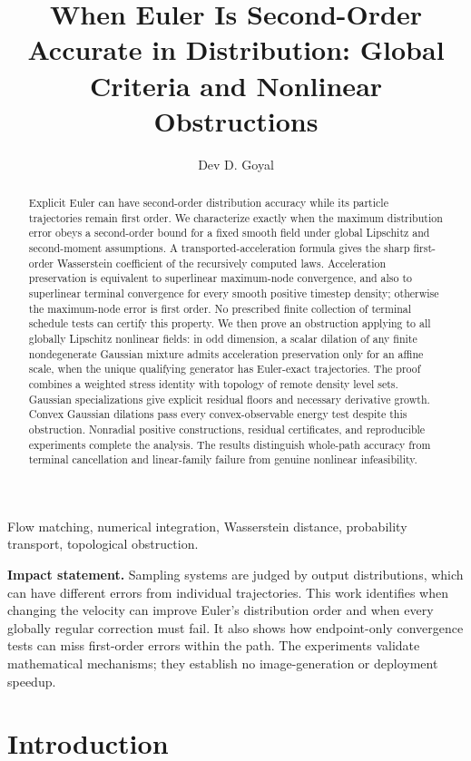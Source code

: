 \documentclass[journal,10pt,romanappendices]{IEEEtran}
\title{When Euler Is Second-Order Accurate in Distribution: Global Criteria and Nonlinear Obstructions}
\author{Dev D. Goyal}
\theoremstyle{definition}
\begin{document}
\maketitle
\begin{abstract}
Explicit Euler can have second-order distribution accuracy while its particle trajectories remain first order. We characterize exactly when the maximum distribution error obeys a second-order bound for a fixed smooth field under global Lipschitz and second-moment assumptions. A transported-acceleration formula gives the sharp first-order Wasserstein coefficient of the recursively computed laws. Acceleration preservation is equivalent to superlinear maximum-node convergence, and also to superlinear terminal convergence for every smooth positive timestep density; otherwise the maximum-node error is first order. No prescribed finite collection of terminal schedule tests can certify this property. We then prove an obstruction applying to all globally Lipschitz nonlinear fields: in odd dimension, a scalar dilation of any finite nondegenerate Gaussian mixture admits acceleration preservation only for an affine scale, when the unique qualifying generator has Euler-exact trajectories. The proof combines a weighted stress identity with topology of remote density level sets. Gaussian specializations give explicit residual floors and necessary derivative growth. Convex Gaussian dilations pass every convex-observable energy test despite this obstruction. Nonradial positive constructions, residual certificates, and reproducible experiments complete the analysis. The results distinguish whole-path accuracy from terminal cancellation and linear-family failure from genuine nonlinear infeasibility.
\end{abstract}
\begin{IEEEkeywords}
Flow matching, numerical integration, Wasserstein distance, probability transport, topological obstruction.
\end{IEEEkeywords}
\noindent\textbf{Impact statement.}
Sampling systems are judged by output distributions, which can have different errors from individual trajectories. This work identifies when changing the velocity can improve Euler's distribution order and when every globally regular correction must fail. It also shows how endpoint-only convergence tests can miss first-order errors within the path. The experiments validate mathematical mechanisms; they establish no image-generation or deployment speedup.

\section{Introduction}
\end{document}
